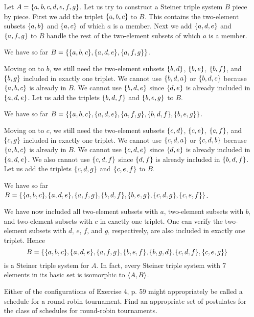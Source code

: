 \begin{solution}
Let $A=\left\{a,b,c,d,e,f,g\right\}$.
Let us try to construct a Steiner triple system $B$ piece by piece.
First we add the triplet $\left\{a,b,c\right\}$ to $B$.
This contains the two-element subsets $\left\{a,b\right\}$ and $\left\{a,c\right\}$ of which $a$ is a member.
Next we add $\left\{a,d,e\right\}$ and $\left\{a,f,g\right\}$ to $B$ handle the rest of the two-element subsets
of which $a$ is a member.

We have so far $B=\set{\set{a,b,c}, \set{a,d,e}, \set{a,f,g}}$.

Moving on to $b$, we still need the two-element subsets $\left\{b,d\right\}$, $\left\{b,e\right\}$, $\left\{b,f\right\}$, and $\left\{b,g\right\}$
included in exactly one triplet.
We cannot use $\left\{b,d,a\right\}$ or $\left\{b,d,c\right\}$ because $\left\{a,b,c\right\}$ is already in $B$.
We cannot use $\left\{b,d,e\right\}$ since $\left\{d,e\right\}$ is already included in $\left\{a,d,e\right\}$.
Let us add the triplets $\left\{b,d,f\right\}$ and $\left\{b,e,g\right\}$ to $B$.

We have so far $B=\set{\set{a,b,c}, \set{a,d,e}, \set{a,f,g}, \set{b,d,f}, \set{b,e,g}}$.

Moving on to $c$, we still need the two-element subsets $\left\{c,d\right\}$, $\left\{c,e\right\}$,
$\left\{c,f\right\}$, and $\left\{c,g\right\}$ included in exactly one triplet.
We cannot use $\left\{c,d,a\right\}$ or $\left\{c,d,b\right\}$ because $\left\{a,b,c\right\}$ is already in $B$.
We cannot use $\left\{c,d,e\right\}$ since $\left\{d,e\right\}$ is already included in $\left\{a,d,e\right\}$.
We also cannot use $\left\{c,d,f\right\}$ since $\left\{d,f\right\}$ is already included in $\left\{b,d,f\right\}$.
Let us add the triplets $\left\{c,d,g\right\}$ and $\left\{c,e,f\right\}$ to $B$.

We have so far $B=\set{\set{a,b,c}, \set{a,d,e}, \set{a,f,g}, \set{b,d,f}, \set{b,e,g}, \set{c,d,g}, \set{c,e,f}}$.

We have now included all two-element subsets with $a$, two-element subsets with $b$, and two-element subsets with $c$
in exactly one triplet. One can verify the two-element subsets with $d$, $e$, $f$, and $g$, respectively,
are also included in exactly one triplet. Hence
\[B=\set{\set{a,b,c}, \set{a,d,e}, \set{a,f,g}, \set{b,e,f}, \set{b,g,d}, \set{c,d,f}, \set{c,e,g}}\]
is a Steiner triple system for $A$.
In fact, every Steiner triple system with 7 elements in its basic set is isomorphic to $\left\langle A, B\right\rangle$.
\end{solution}

\begin{exercise}
Either of the configurations of Exercise 4, p. 59 might appropriately be called a
schedule for a round-robin tournament. Find an appropriate set of postulates for the
class of schedules for round-robin tournaments.
\end{exercise}

